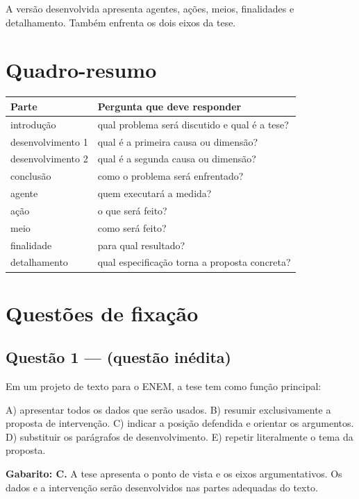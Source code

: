 \documentclass[11pt,a4paper]{article}
\begin{document}
A versão desenvolvida apresenta agentes, ações, meios, finalidades e detalhamento. Também enfrenta os dois eixos da tese.

\section*{Quadro-resumo}

\begin{tabularx}{\linewidth}{lX}
\toprule
 \textbf{Parte} & \textbf{Pergunta que deve responder} \\
\midrule
 introdução & qual problema será discutido e qual é a tese? \\
 desenvolvimento 1 & qual é a primeira causa ou dimensão? \\
 desenvolvimento 2 & qual é a segunda causa ou dimensão? \\
 conclusão & como o problema será enfrentado? \\
 agente & quem executará a medida? \\
 ação & o que será feito? \\
 meio & como será feito? \\
 finalidade & para qual resultado? \\
 detalhamento & qual especificação torna a proposta concreta? \\
\bottomrule
\end{tabularx}


\section*{Questões de fixação}

\subsection*{Questão 1 — (questão inédita)}

Em um projeto de texto para o ENEM, a tese tem como função principal:

A) apresentar todos os dados que serão usados. B) resumir exclusivamente a proposta de intervenção. C) indicar a posição defendida e orientar os argumentos. D) substituir os parágrafos de desenvolvimento. E) repetir literalmente o tema da proposta.

\begin{alerta}
\textbf{Gabarito: C.} A tese apresenta o ponto de vista e os eixos argumentativos. Os dados e a intervenção serão desenvolvidos nas partes adequadas do texto.
\end{alerta}
\end{document}
